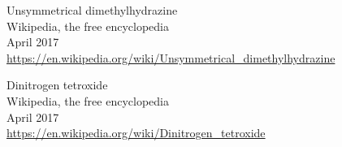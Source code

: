 \documentclass{article}
\begin{document}
\begin{thebibliography}{99}
	Unsymmetrical dimethylhydrazine\\
	Wikipedia, the free encyclopedia\\
	April 2017\\
	\url{https://en.wikipedia.org/wiki/Unsymmetrical_dimethylhydrazine}
	
	Dinitrogen tetroxide\\
	Wikipedia, the free encyclopedia\\
	April 2017\\
	\url{https://en.wikipedia.org/wiki/Dinitrogen_tetroxide}



\end{thebibliography}
\end{document}
